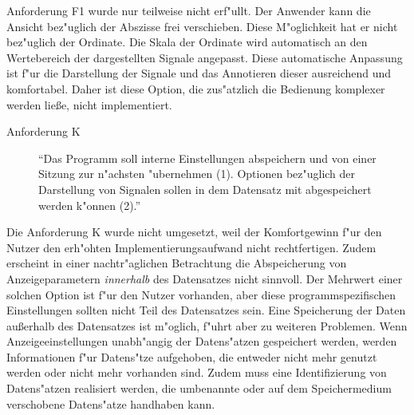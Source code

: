 Anforderung F1 wurde nur teilweise nicht erf"ullt.
Der Anwender kann die Ansicht bez"uglich der Abszisse frei verschieben.
Diese M"oglichkeit hat er nicht bez"uglich der Ordinate.
Die Skala der Ordinate wird automatisch an den Wertebereich der dargestellten Signale angepasst.
Diese automatische Anpassung ist f"ur die Darstellung der Signale und das Annotieren dieser ausreichend und komfortabel.
Daher ist diese Option, die zus"atzlich die Bedienung komplexer werden lie{\ss}e, nicht implementiert.


\begin{description}
	\item[Anforderung K] "`Das Programm soll interne Einstellungen abspeichern und von einer Sitzung zur n"achsten "ubernehmen (1).
					   Optionen bez"uglich der Darstellung von Signalen sollen in dem Datensatz mit abgespeichert werden k"onnen (2)."'
\end{description}

Die Anforderung K wurde nicht umgesetzt, weil der Komfortgewinn f"ur den Nutzer den erh"ohten Implementierungsaufwand nicht rechtfertigen.
Zudem erscheint in einer nachtr"aglichen Betrachtung die Abspeicherung von Anzeigeparametern \emph{innerhalb} des Datensatzes nicht sinnvoll.
Der Mehrwert einer solchen Option ist f"ur den Nutzer vorhanden, aber diese programmspezifischen Einstellungen sollten nicht Teil des Datensatzes sein.
Eine Speicherung der Daten au{\ss}erhalb des Datensatzes ist m"oglich, f"uhrt aber zu weiteren Problemen.
Wenn Anzeigeeinstellungen unabh"angig der Datens"atzen gespeichert werden, werden Informationen f"ur Datens"tze aufgehoben, die entweder nicht mehr genutzt werden oder nicht mehr vorhanden sind.
Zudem muss eine Identifizierung von Datens"atzen realisiert werden, die umbenannte oder auf dem Speichermedium verschobene Datens"atze handhaben kann.


